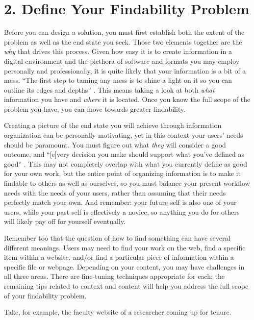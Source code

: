 \documentclass[10pt,letterpaper]{article}
\newcommand{\rulemajor}[1]{\section*{#1}}
\begin{document}
\rulemajor{2. Define Your Findability Problem}

Before you can design a solution, you must first establish both the
extent of the problem as well as the end state you seek. Those two
elements together are the \emph{why} that drives this process. Given how
easy it is to create information in a digital environment and the
plethora of software and formats you may employ personally and
professionally, it is quite likely that your information is a bit of a
mess. ``The first step to taming any mess is to shine a light on it so
you can outline its edges and depths'' \cite{Covert2014}. This means taking a look
at both \emph{what} information you have and \emph{where} it is located.
Once you know the full scope of the problem you have, you can move
towards greater findability.

Creating a picture of the end state you will achieve through information
organization can be personally motivating, yet in this context your
users' needs should be paramount. You must figure out what \emph{they}
will consider a good outcome, and ``[e]very decision you make should
support what you've defined as good'' \cite{Covert2014}. This may not completely
overlap with what you currently define as good for your own work, but
the entire point of organizing information is to make it findable to
others as well as ourselves, so you must balance your present workflow
needs with the needs of your users, rather than assuming that their
needs perfectly match your own. And remember: your future self is also
one of your users, while your past self is effectively a novice, so
anything you do for others will likely pay off for yourself eventually.

Remember too that the question of how to find something can have several
different meanings. Users may need to find your work on the web, find a
specific item within a website, and/or find a particular piece of
information within a specific file or webpage. Depending on your
content, you may have challenges in all three areas. There are
fine-tuning techniques appropriate for each; the remaining tips related
to context and content will help you address the full scope of your
findability problem.

Take, for example, the faculty website of a researcher coming up for
tenure.
\end{document}
